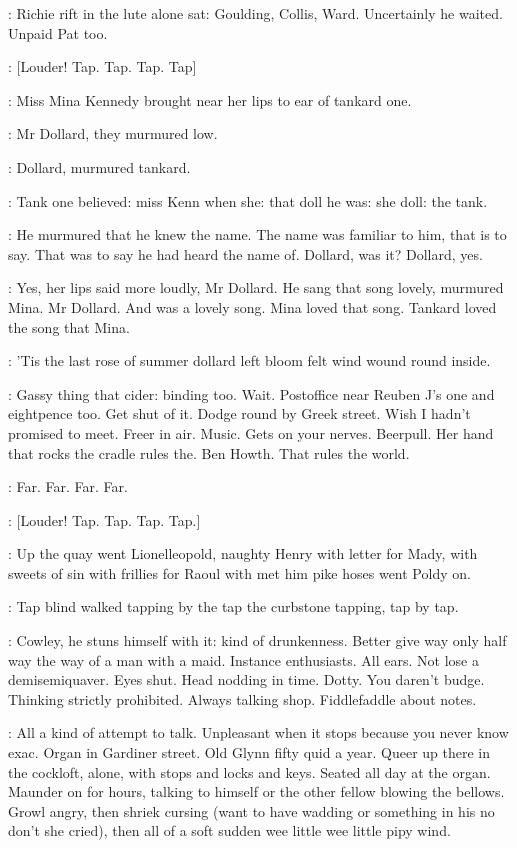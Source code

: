 :
Richie rift in the lute alone sat: Goulding, Collis, Ward. Uncertainly
he waited. Unpaid Pat too.

\stripling:
[Louder! Tap. Tap. Tap. Tap]

:
Miss Mina Kennedy brought near her lips to ear of tankard one.

:
Mr Dollard, they murmured low.

:
Dollard, murmured tankard.

:
Tank one believed:
miss Kenn when she: that doll he was: she doll:
the tank.

:
He murmured that he knew the name. The name was familiar to him,
that is to say. That was to say he had heard the name of. Dollard, was it?
Dollard, yes.

:
Yes, her lips said more loudly, Mr Dollard. He sang that song lovely,
murmured Mina. Mr Dollard. And
 was a lovely
song. Mina loved that song. Tankard loved the song that Mina.

:
'Tis the last rose of summer dollard left bloom felt wind wound round
inside.

\BloomInt:
Gassy thing that cider: binding too.
Wait. Postoffice near Reuben J's
one and eightpence too. Get shut of it. Dodge round by Greek street. Wish
I hadn't promised to meet. Freer in air. Music. Gets on your nerves.
Beerpull. Her hand that rocks the cradle rules the. Ben Howth. That rules
the world.

:
Far. Far. Far. Far.

\stripling:
[Louder! Tap. Tap. Tap. Tap.]

:
Up the quay went Lionelleopold, naughty Henry with letter for
Mady, with sweets of sin with frillies for Raoul with met him pike hoses
went Poldy on.

:
Tap blind walked
tapping by the tap the curbstone tapping,
tap by tap.

\BloomInt:
Cowley, he stuns himself with it: kind of drunkenness. Better give
way only half way the way of a man with a maid. Instance enthusiasts. All
ears. Not lose a demisemiquaver. Eyes shut. Head nodding in time. Dotty.
You daren't budge. Thinking strictly prohibited. Always talking shop.
Fiddlefaddle about notes.

\BloomInt:
All a kind of attempt to talk. Unpleasant when it stops because you
never know exac. Organ in Gardiner street. Old Glynn fifty quid a year.
Queer up there in the cockloft, alone, with stops and locks and keys.
Seated all day at the organ. Maunder on for hours, talking to himself or
the other fellow blowing the bellows.
Growl angry, then shriek cursing
(want to have wadding or something in his no don't she cried), then all of
a soft sudden wee little wee little pipy wind.

